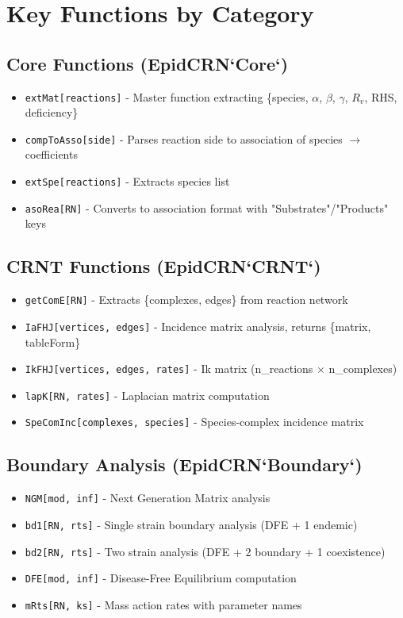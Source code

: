 \documentclass{article}
\begin{document}
\section{Key Functions by Category}

\subsection{Core Functions (EpidCRN`Core`)}

\begin{itemize}
\item \texttt{extMat[reactions]} - Master function extracting \{species, $\alpha$, $\beta$, $\gamma$, $R_v$, RHS, deficiency\}
\item \texttt{compToAsso[side]} - Parses reaction side to association of species $\rightarrow$ coefficients
\item \texttt{extSpe[reactions]} - Extracts species list
\item \texttt{asoRea[RN]} - Converts to association format with "Substrates"/"Products" keys
\end{itemize}

\subsection{CRNT Functions (EpidCRN`CRNT`)}

\begin{itemize}
\item \texttt{getComE[RN]} - Extracts \{complexes, edges\} from reaction network
\item \texttt{IaFHJ[vertices, edges]} - Incidence matrix analysis, returns \{matrix, tableForm\}
\item \texttt{IkFHJ[vertices, edges, rates]} - Ik matrix (n\_reactions $\times$ n\_complexes)
\item \texttt{lapK[RN, rates]} - Laplacian matrix computation
\item \texttt{SpeComInc[complexes, species]} - Species-complex incidence matrix
\end{itemize}

\subsection{Boundary Analysis (EpidCRN`Boundary`)}

\begin{itemize}
\item \texttt{NGM[mod, inf]} - Next Generation Matrix analysis
\item \texttt{bd1[RN, rts]} - Single strain boundary analysis (DFE + 1 endemic)
\item \texttt{bd2[RN, rts]} - Two strain analysis (DFE + 2 boundary + 1 coexistence)
\item \texttt{DFE[mod, inf]} - Disease-Free Equilibrium computation
\item \texttt{mRts[RN, ks]} - Mass action rates with parameter names
\end{itemize}
\end{document}
